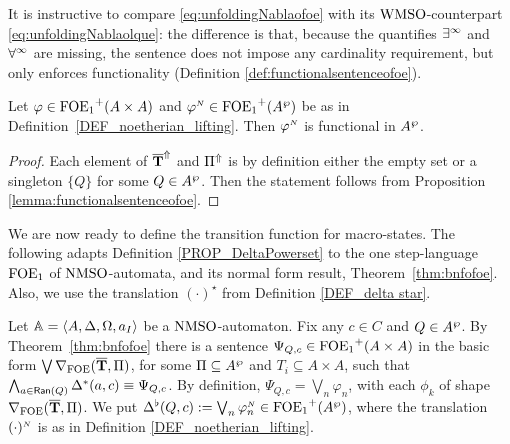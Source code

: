 It is instructive to compare \eqref{eq:unfoldingNablaofoe} with its $\mathrm{WMSO}$-counterpart \eqref{eq:unfoldingNablaolque}: the difference is that, because the quantifies $\exists^\infty$ and $\forall^\infty$ are missing, the sentence does not impose any cardinality requirement, but only enforces functionality (Definition \ref{def:functionalsentenceofoe}).


\begin{lemma}\label{lemma:automatafunctionalsentence}
Let $\varphi \in {\ensuremath{\mathrm{FOE}_1}}^+(A \times A)$ and $\varphi^{{\scriptscriptstyle N}}\in {\ensuremath{\mathrm{FOE}_1}}^+(A^{\wp} )$ be as in Definition~\ref{DEF_noetherian_lifting}. Then $\varphi^{{\scriptscriptstyle N}}$ is functional in $A^{\wp}$.
 \end{lemma}
\begin{proof}
Each element of $\overline{{\mathbf{T}}}^{\Uparrow}$ and $\Pi^{\Uparrow}$ is by definition either the empty set or a singleton $\{Q\}$ for some $Q \in A^{\wp}$. Then the statement follows from Proposition \ref{lemma:functionalsentenceofoe}.\end{proof}

 We are now ready to define the transition function for macro-states. The following adapts Definition \ref{PROP_DeltaPowerset} to the one step-language $\mathrm{FOE}_1$ of $\mathrm{NMSO}$-automata, and its normal form result, Theorem~\ref{thm:bnfofoe}. Also, we use the translation $(\cdot)^{\star}$ from Definition \ref{DEF_delta star}.
\begin{definition}\label{PROP_DeltaPowerset_noet}
Let $\mathbb{A} = \langle{A,\Delta,\Omega,a_I}\rangle$ be a $\mathrm{NMSO}$-automaton. Fix any $c \in C$ and $Q \in A^{\wp}$. By Theorem~\ref{thm:bnfofoe} there is a sentence $\Psi_{Q,c} \in {\ensuremath{\mathrm{FOE}_1}}^+(A\times A)$ in the basic form $\bigvee \nabla_{\mathrm{FOE}}(\overline{{\mathbf{T}}},\Pi)$, for some $\Pi \subseteq A^{\wp}$ and $T_i \subseteq A \times A$, such that $\bigwedge_{a \in \mathsf{Ran}(Q)} \Delta^{*}(a,c) \equiv \Psi_{Q,c}$.
By definition, $\Psi_{Q,c} = \bigvee_{n}\varphi_n$, with each $\phi_{k}$ of shape $\nabla_{\mathrm{FOE}}(\overline{{\mathbf{T}}},\Pi)$.
%
We put $\Delta^{\flat}(Q,c) := \bigvee_{n}\varphi_n^{{\scriptscriptstyle N}}  \in {\ensuremath{\mathrm{FOE}_1}}^+(A^{\wp})$, where the translation $(\cdot)^{{\scriptscriptstyle N}}$ is as in Definition \ref{DEF_noetherian_lifting}.
\end{definition}

